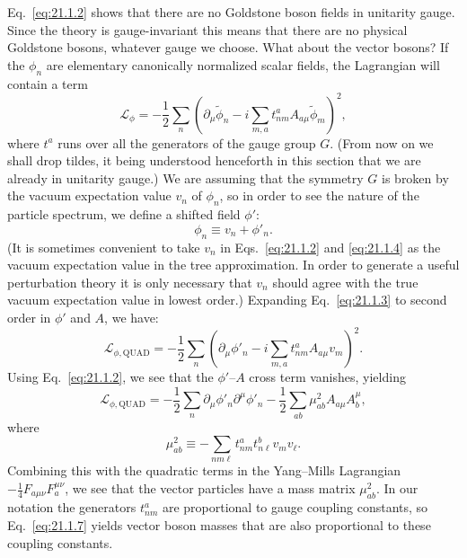 Eq.~\eqref{eq:21.1.2} shows that there are no Goldstone boson fields in
unitarity gauge. Since the theory is gauge-invariant this means that there
are no physical Goldstone bosons, whatever gauge we choose. What about the
vector bosons? If the $\phi_n$ are elementary canonically normalized scalar
fields, the Lagrangian will contain a term
\begin{equation}
 \mathcal L_\phi
 =-\frac12\sum_n\left(
 \partial_\mu\widetilde{\phi}_n
 -i\sum_{m,a}t^a_{nm}A_{a\mu}
 \widetilde{\phi}_m\right)^2,
 \tag{21.1.3}\label{eq:21.1.3}
\end{equation}
where $t^a$ runs over all the generators of the gauge group $G$.
(From now on we shall drop tildes, it being understood henceforth in this
section that we are already in unitarity gauge.) We are assuming that the
symmetry $G$ is broken by the vacuum expectation value $v_n$ of $\phi_n$,
so in order to see the nature of the particle spectrum, we define a shifted
field $\phi'$:
\begin{equation}
 \phi_n\equiv v_n+\phi'_n.
 \tag{21.1.4}\label{eq:21.1.4}
\end{equation}
(It is sometimes convenient to take $v_n$ in Eqs.~\eqref{eq:21.1.2} and
\eqref{eq:21.1.4} as the vacuum expectation value in the tree
approximation. In order to generate a useful perturbation theory it is only
necessary that $v_n$ should agree with the true vacuum expectation value in
lowest order.) Expanding Eq.~\eqref{eq:21.1.3} to second order in $\phi'$
and $A$, we have:
\begin{equation}
 \mathcal L_{\phi,\mathrm{QUAD}}
 =-\frac12\sum_n\left(
 \partial_\mu\phi'_n
 -i\sum_{m,a}t^a_{nm}A_{a\mu}v_m\right)^2.
 \tag{21.1.5}\label{eq:21.1.5}
\end{equation}
Using Eq.~\eqref{eq:21.1.2}, we see that the $\phi'$--$A$ cross term
vanishes, yielding
\begin{equation}
 \mathcal L_{\phi,\mathrm{QUAD}}
 =-\frac12\sum_n\partial_\mu\phi'_n\partial^\mu\phi'_n
 -\frac12\sum_{ab}\mu^2_{ab}
 A_{a\mu}A_b^\mu,
 \tag{21.1.6}\label{eq:21.1.6}
\end{equation}
where
\begin{equation}
 \mu^2_{ab}
 \equiv-\sum_{nm\ell}t^a_{nm}t^b_{n\ell}v_mv_\ell.
 \tag{21.1.7}\label{eq:21.1.7}
\end{equation}
Combining this with the quadratic terms in the Yang--Mills Lagrangian
$-\frac14F_{a\mu\nu}F_a^{\mu\nu}$, we see that the vector
particles have a mass matrix $\mu^2_{ab}$. In our notation the
generators $t^a_{nm}$ are proportional to gauge coupling constants, so
Eq.~\eqref{eq:21.1.7} yields vector boson masses that are also proportional
to these coupling constants.

